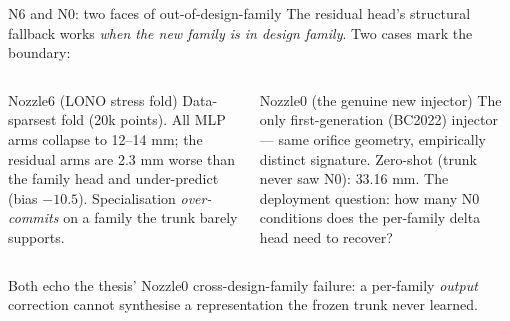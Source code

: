 \documentclass[UTF8,aspectratio=169]{ctexbeamer}
\newcommand{\warn}[1]{\textcolor{red!65!black}{#1}}
\begin{document}
\begin{frame}{N6 and N0: two faces of out-of-design-family}
\small
The residual head's structural fallback works \emph{when the new family is in design
family}. Two cases mark the boundary:

\vspace{0.3em}
\begin{columns}[T]
\begin{block}{Nozzle6 (LONO stress fold)}
Data-sparsest fold (20k points). All MLP arms collapse to 12--14 mm; the residual
arms are \warn{2.3 mm worse} than the family head and under-predict (bias $-10.5$).
Specialisation \emph{over-commits} on a family the trunk barely supports.
\end{block}

\begin{block}{Nozzle0 (the genuine new injector)}
The only first-generation (BC2022) injector --- same orifice geometry, empirically
distinct signature. Zero-shot (trunk never saw N0): \warn{33.16 mm}. The deployment
question: how many N0 conditions does the per-family delta head need to recover?
\end{block}
\end{columns}

\vspace{0.4em}
\footnotesize
Both echo the thesis' Nozzle0 cross-design-family failure: a per-family \emph{output}
correction cannot synthesise a representation the frozen trunk never learned.
\end{frame}
\end{document}
